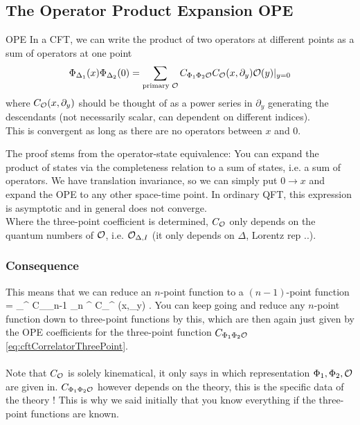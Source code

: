  
 
  \subsection{The Operator Product Expansion OPE}
  \begin{mybox}{OPE}
  	In a CFT, we can write the product of two operators at different points as a sum of operators at one point
 \begin{equation}
 \label{eq:cftOPE}
 \Phi_{\Delta_1}(x) \Phi_{\Delta_2}(0) = \sum_{\text{primary } \mathcal{O}} C_{\Phi_1 \Phi_2 \mathcal{O}} C_{\mathcal{O}}(x,\partial_y) \mathcal{O}(y) |_{y=0} 
 \end{equation}
 where $C_{\mathcal{O}}(x,\partial_y)$ should be thought of as a power series in $\partial_y$ generating the descendants (not necessarily scalar, can dependent on different indices).\\
 This is convergent as long as there are no operators between $x$ and $0$.
 \end{mybox}
The proof stems from the operator-state equivalence: You can expand the product of states via the completeness relation to a sum of states, i.e. a sum of operators. We have translation invariance, so we can simply put $0 \rightarrow x$ and expand the OPE to any other space-time point. In ordinary QFT, this expression is asymptotic and in general does not converge.\\
Where the three-point coefficient is determined, $C_{\mathcal{O}}$ only depends on the quantum numbers of $\mathcal{O}$, i.e. $\mathcal{O}_{\Delta,I}$ (it only depends on $\Delta$, Lorentz rep ..).\\

\subsubsection{Consequence}
This means that we can reduce an $n$-point function to a $(n-1)$-point function
\bse 
{} = \sum_{\mO^\prime} C_{\mO_{n-1} \mO_n \mO^\prime} C_{\mO^\prime} (x,\partial_y) .
\ese 
You can keep going and reduce any $n$-point function down to three-point functions by this, which are then again just given by the OPE coefficients for the three-point function $C_{\Phi_1 \Phi_2 \mathcal{O}}$ \ref{eq:cftCorrelatorThreePoint}.\\
\\
Note that $C_{\mathcal{O}}$ is solely kinematical, it only says in which representation $\Phi_1,\Phi_2,\mathcal{O}$ are given in. $C_{\Phi_1\Phi_2 \mathcal{O}}$ however depends on the theory, this is the specific data of the theory ! This is why we said initially that you know everything if the three-point functions are known.

